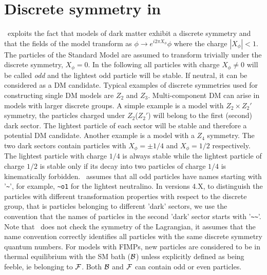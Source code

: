 \documentclass[12pt,a4paper]{article}
\begin{document}
 
\section{Discrete symmetry in \micro}

 \micro\ exploits the fact that models of dark matter exhibit a discrete symmetry
and that the fields  of the model transform as 
$   \phi \to e^{i2\pi X_{\phi}} \phi$
where the charge $|X_{\phi}|<1$. 
The particles of the  Standard Model 
are assumed to transform trivially under the discrete symmetry, $X_\phi=0$. In the following all particles with
 charge $X_\phi\neq 0$  will be called 
 {\it odd} and the  lightest odd particle  will be  stable. If neutral, it can be considered as a DM candidate.
Typical  examples  of discrete symmetries used for constructing single DM models  are $Z_2$ and  $Z_3$. 
Multi-component DM can arise in models with larger discrete groups. A simple 
example is a model with  $Z_2\times Z_2'$ symmetry, the particles charged under  $Z_2$($Z_2'$) will belong to the first (second) dark sector. The lightest particle of each sector  will be stable and therefore a potential DM candidate. 
Another example is a model with a $Z_4$  symmetry.  The two dark sectors contain particles with $X_\phi=\pm 1/4$ and $X_\phi=1/2$ respectively. The lightest particle with  charge $1/4$ is always stable while the lightest particle of charge $1/2$ is stable only if its decay into two particles of charge $1/4$ is kinematically forbidden.
 \micro\ assumes that all odd particles have  names
starting with '\verb|~|', for example, \verb|~o1| for the lightest  
neutralino. In versions 4.X, to distinguish the particles with different transformation properties with 
respect to the discrete group, that is particles belonging to different 'dark' sectors,
we use the convention that the names of particles in the second 'dark' sector starts with '\verb|~~|'. 
Note that \micro\ does not check the symmetry of the Lagrangian, it assumes that the name convention 
correctly identifies  all particles with the same discrete symmetry quantum numbers.
For models with FIMPs, new particles are considered to be in thermal equilibrium with the SM bath (${\cal B}$) unless explicitly defined as being feeble, ie belonging to ${\cal F}$. Both ${\cal B}$ and ${\cal F}$ can contain odd or even particles. 

  
\end{document}
